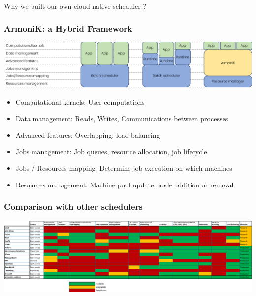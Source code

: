 \documentclass[10pt,aspectratio=1609]{beamer}
\begin{document}
\begin{section}{Why we built our own cloud-native scheduler ?}
  \begin{frame}
    \frametitle{ArmoniK: a Hybrid Framework}
    \includegraphics[width=\textwidth]{hpc-orchestrators.png}
    \begin{itemize}
      \item Computational kernels: User computations
      \item Data management: Reads, Writes, Communications between processes
      \item Advanced features: Overlapping, load balancing
      \item Jobs management: Job queues, resource allocation, job lifecycle
      \item Jobs / Resources mapping: Determine job execution on which machines
      \item Resources management: Machine pool update, node addition or removal
    \end{itemize}
  \end{frame}

  \begin{frame}
    \frametitle{Comparison with other schedulers}
    \includegraphics[width=\textwidth]{pos-1.png}
  \end{frame}
\end{section}
\end{document}

